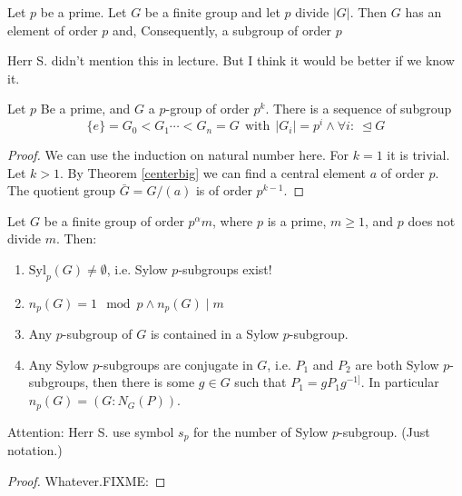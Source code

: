 \begin{theorem}
    Let \(p\) be a prime. Let \(G\) be a finite group and let \(p\) divide \(|G|\). Then \(G\) has an element of order \(p\) and, Consequently, a subgroup of order \(p\)    
\end{theorem}
\begin{remark}
    Herr S. didn't mention this in lecture. But I think it would be better if we know it.
\end{remark}

\begin{theorem}
     Let \(p\) Be a prime, and \(G\) a \(p\)-group of order \(p^k\). There is a sequence of subgroup\[\{e\}=G_0<G_1\cdots <G_n =  G\ \ \text{with}\ \ |G_i|=p^i \wedge \forall i:\ \trianglelefteq G \]
\end{theorem}
\begin{proof}
    We can use the induction on natural number here. For \(k = 1\) it is trivial. Let \(k>1\). By Theorem \ref{centerbig} we can find a central element \(a\) of order \(p\). The quotient group \(\bar{G} = G / (a)\) is of order \(p^{k-1}\).
\end{proof}

\begin{theorem}[Sylow]
    Let \(G\) be a finite group of order \(p^\alpha m\), where \(p\) is a prime, \(m\geq 1\), and \(p\) does not divide \(m\). Then: \begin{enumerate}
        \item \(\mathrm{Syl}_p(G)\not = \emptyset\), i.e. Sylow \(p\)-subgroups exist!
        \item \(n_p(G) = 1\mod p \wedge n_p(G) \mid m\)
        \item  Any \(p\)-subgroup of \(G\) is contained in a Sylow \(p\)-subgroup.
        \item Any Sylow \(p\)-subgroups are conjugate in \(G\), i.e. \(P_1\) and \(P_2\) are both Sylow \(p\)-subgroups, then there is some \(g\in G\) such that \(P_1 = gP_1 g^{-1]}\). In particular \(n_p(G) = (G:N_G(P))\).
    \end{enumerate}    
\end{theorem}
\begin{remark}
    Attention: Herr S. use symbol \(s_p\) for the number of Sylow \(p\)-subgroup. (Just notation.)
\end{remark}
\begin{proof}
    Whatever.FIXME:
\end{proof}